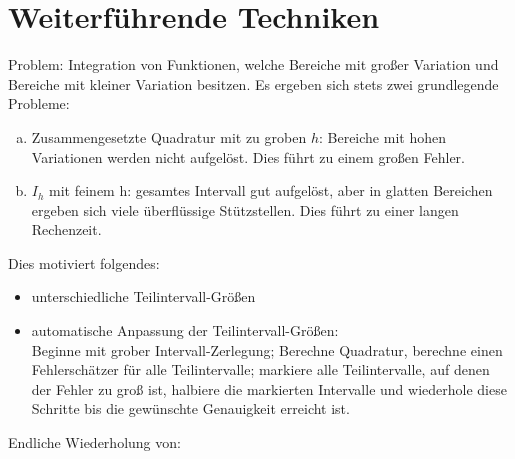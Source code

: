 \documentclass[11pt]{scrbook}
\begin{document}
\section{Weiterführende Techniken}
\begin{seg}
	Problem: Integration von Funktionen, welche Bereiche mit großer Variation und Bereiche mit kleiner Variation besitzen. Es ergeben sich stets zwei grundlegende Probleme:
	\begin{enumerate}[a)]
		\item Zusammengesetzte Quadratur mit zu groben $h$: Bereiche mit hohen Variationen werden nicht aufgelöst. Dies führt zu einem großen Fehler.
		\item $I_h$ mit feinem h: gesamtes Intervall gut aufgelöst, aber in glatten Bereichen ergeben sich viele überflüssige Stützstellen. Dies führt zu einer langen Rechenzeit.
	\end{enumerate}
\end{seg}
\begin{seg}[Idee:]
	Dies motiviert folgendes:
	\begin{itemize}
		\item unterschiedliche Teilintervall-Größen
		\item automatische Anpassung der Teilintervall-Größen:\\
		 Beginne mit grober Intervall-Zerlegung; Berechne Quadratur, berechne einen Fehlerschätzer für alle Teilintervalle; markiere alle Teilintervalle, auf denen der Fehler zu groß ist, halbiere die markierten Intervalle und wiederhole diese Schritte bis die gewünschte Genauigkeit erreicht ist.
	\end{itemize}
\end{seg}
\begin{seg} 
Endliche Wiederholung von: \\
	\begin{figure}[H]
		  \\
\end{figure}
\end{seg}
\end{document}
